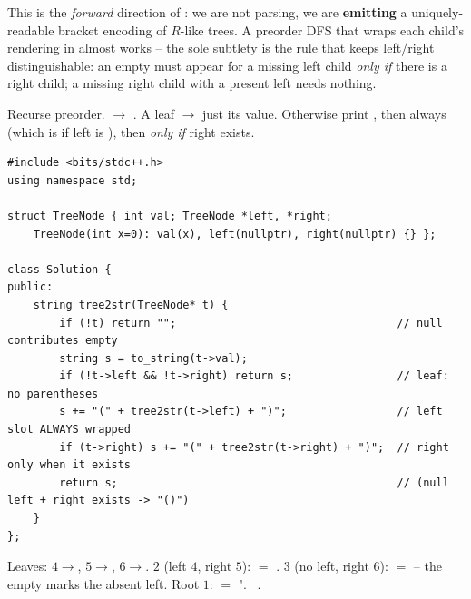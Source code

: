 This is the \emph{forward} direction of : we are not parsing, we are
\textbf{emitting} a uniquely-readable bracket encoding of $R$-like trees. A preorder DFS that
wraps each child's rendering in \code{()} almost works -- the sole subtlety is the rule that
keeps left/right distinguishable: an empty \code{()} must appear for a missing left child
\emph{only if} there is a right child; a missing right child with a present left needs
nothing.

Recurse preorder.  $\to$ . A leaf $\to$ just its value. Otherwise print
, then always  (which is  if left is ),
then  \emph{only if} right exists.

\begin{lstlisting}[caption={Construct String from Binary Tree (LeetCode 606)}, label={lst:c04-string-tree}]
#include <bits/stdc++.h>
using namespace std;

struct TreeNode { int val; TreeNode *left, *right;
    TreeNode(int x=0): val(x), left(nullptr), right(nullptr) {} };

class Solution {
public:
    string tree2str(TreeNode* t) {
        if (!t) return "";                                  // null contributes empty
        string s = to_string(t->val);
        if (!t->left && !t->right) return s;                // leaf: no parentheses
        s += "(" + tree2str(t->left) + ")";                 // left slot ALWAYS wrapped
        if (t->right) s += "(" + tree2str(t->right) + ")";  // right only when it exists
        return s;                                           // (null left + right exists -> "()")
    }
};
\end{lstlisting}

\begin{tracebox}
Leaves: $4\to$, $5\to$, $6\to$.
$2$ (left $4$, right $5$):  $=$ .
$3$ (no left, right $6$):  $=$  -- the
empty \code{()} marks the absent left.
Root $1$:  $=$ ". \checkmark\ .
\end{tracebox}


